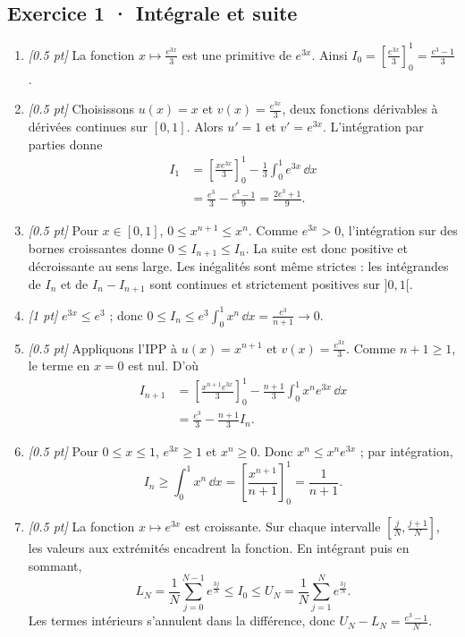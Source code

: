 \subsection*{Exercice 1 · Intégrale et suite}\begin{enumerate}

\item \textit{[\num{0,5} pt]} La fonction $x\mapsto \frac{e^{3x}}{3}$ est une primitive de $e^{3x}$. Ainsi $I_0=[\frac{e^{3x}}{3}]_0^1=\frac{e^{3}-1}{3}$.

\item \textit{[\num{0,5} pt]} Choisissons $u(x)=x$ et $v(x)=\frac{e^{3x}}{3}$, deux fonctions dérivables à dérivées continues sur $[0,1]$. Alors $u'=1$ et $v'=e^{3x}$. L'intégration par parties donne
\[\begin{aligned}I_1&=\left[\frac{xe^{3x}}{3}\right]_0^1-\frac{1}{3}\int_0^1e^{3x}\,\dd x\\&=\frac{e^{3}}{3}-\frac{e^{3}-1}{9}=\frac{2e^{3}+1}{9}.\end{aligned}\]

\item \textit{[\num{0,5} pt]} Pour $x\in[0,1]$, $0\le x^{n+1}\le x^n$. Comme $e^{3x}>0$, l'intégration sur des bornes croissantes donne $0\le I_{n+1}\le I_n$. La suite est donc positive et décroissante au sens large. Les inégalités sont même strictes : les intégrandes de $I_n$ et de $I_n-I_{n+1}$ sont continues et strictement positives sur $]0,1[$.

\item \textit{[1 pt]} $e^{3x}\le e^{3}$ ; donc $0\le I_n\le e^{3}\int_0^1x^n\,\dd x=\frac{e^{3}}{n+1}\to0$.

\item \textit{[\num{0,5} pt]} Appliquons l'IPP à $u(x)=x^{n+1}$ et $v(x)=\frac{e^{3x}}{3}$. Comme $n+1\ge1$, le terme en $x=0$ est nul. D'où
\[\begin{aligned}I_{n+1}&=\left[\frac{x^{n+1}e^{3x}}{3}\right]_0^1-\frac{n+1}{3}\int_0^1x^ne^{3x}\,\dd x\\&=\frac{e^{3}}{3}-\frac{n+1}{3}I_n.\end{aligned}\]

\item \textit{[\num{0,5} pt]} Pour $0\le x\le1$, $e^{3x}\ge1$ et $x^n\ge0$. Donc $x^n\le x^ne^{3x}$ ; par intégration,
\[I_n\ge\int_0^1x^n\,\dd x=\left[\frac{x^{n+1}}{n+1}\right]_0^1=\frac{1}{n+1}.\]

\item \textit{[\num{0,5} pt]} La fonction $x\mapsto e^{3x}$ est croissante. Sur chaque intervalle $[\frac{j}{N},\frac{j+1}{N}]$, les valeurs aux extrémités encadrent la fonction. En intégrant puis en sommant,
\[L_N=\frac{1}{N}\sum_{j=0}^{N-1}e^{\frac{3j}{N}}\le I_0\le U_N=\frac{1}{N}\sum_{j=1}^Ne^{\frac{3j}{N}}.\]
Les termes intérieurs s'annulent dans la différence, donc $U_N-L_N=\frac{e^{3}-1}{N}$.


\end{enumerate}
